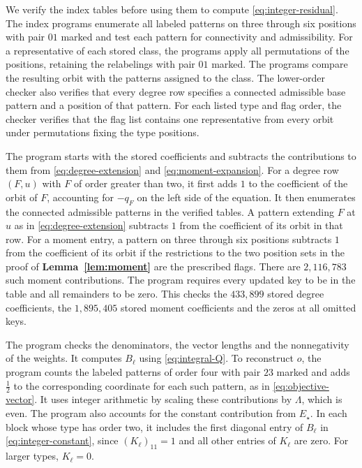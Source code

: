 We verify the index tables before using them to compute
\eqref{eq:integer-residual}. The index programs enumerate all labeled
patterns on three through six positions with pair $01$ marked and
test each pattern for connectivity and admissibility. For a
representative of each stored class, the programs apply all
permutations of the positions, retaining the relabelings with pair
$01$ marked. The programs compare the resulting orbit with the
patterns assigned to the class. The lower-order checker also verifies
that every degree row specifies a connected admissible base pattern
and a position of that pattern. For each listed type and flag order,
the checker verifies that the flag list contains one representative
from every orbit under permutations fixing the type positions.

The program  starts with the stored
coefficients and subtracts the contributions to them from
\eqref{eq:degree-extension} and \eqref{eq:moment-expansion}. For a
degree row $(F,u)$ with $F$ of order greater than two, it first
adds $1$ to the coefficient of the orbit of $F$, accounting for
$-q_F$ on the left side of the equation. It then enumerates the
connected admissible patterns in the verified tables. A pattern
extending $F$ at $u$ as in \eqref{eq:degree-extension} subtracts
$1$ from the coefficient of its orbit in that row. For a moment
entry, a pattern on three through six positions subtracts $1$
from the coefficient of its orbit if the restrictions to the two
position sets in the proof of \textbf{Lemma~\ref{lem:moment}} are
the prescribed flags. There are $2{,}116{,}783$ such moment
contributions. The program requires every updated key to be in
the table and all remainders to be zero. This checks the
$433{,}899$ stored degree coefficients, the $1{,}895{,}405$ stored
moment coefficients and the zeros at all omitted keys.

The program  checks the denominators,
the vector lengths and the nonnegativity of the weights. It computes
$B_\ell$ using \eqref{eq:integral-Q}. To reconstruct $o$, the program
counts the labeled patterns of order four with pair $23$ marked and
adds $\frac{1}{2}$ to the corresponding coordinate for each such
pattern, as in \eqref{eq:objective-vector}. It uses integer arithmetic
by scaling these contributions by $\Lambda$, which is even. The
program also accounts for the constant contribution from $E_\star$.
In each block whose type has order two, it includes the first
diagonal entry of $B_\ell$ in \eqref{eq:integer-constant}, since
$(K_\ell)_{11}=1$ and all other entries of $K_\ell$ are zero.
For larger types, $K_\ell=0$.

